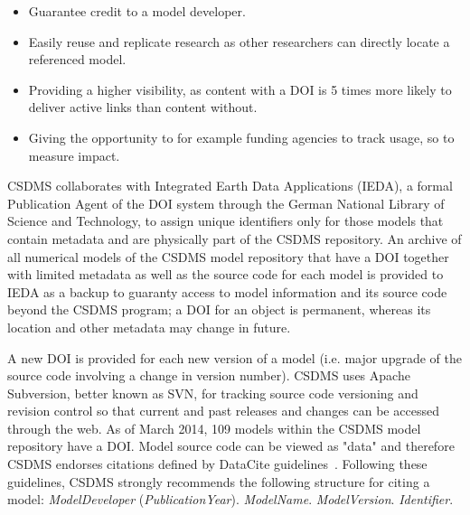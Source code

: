 \documentclass[11pt, oneside]{amsart}
\begin{document}
\begin{itemize}

\item Guarantee credit to a model developer.

\item Easily reuse and replicate research as other researchers can directly
      locate a referenced model.

\item Providing a higher visibility, as content with a DOI is 5 times more
      likely to deliver active links than content without.

\item Giving the opportunity to for example funding agencies to track usage,
      so to measure impact.

\end{itemize}

CSDMS collaborates with Integrated Earth Data Applications
(IEDA), a formal Publication Agent of the DOI system through the German National
Library of Science and Technology, to assign unique identifiers only for those
models that contain metadata and are physically part of the CSDMS repository. An
archive of all numerical models of the CSDMS model repository that have a DOI
together with limited metadata as well as the source code for each model is
provided to IEDA as a backup to guaranty access to model information and its
source code beyond the CSDMS program; a DOI for an object is permanent, whereas
its location and other metadata may change in future.

A new DOI is provided for each new version of a model (i.e. major upgrade of the
source code involving a change in version number). CSDMS uses Apache Subversion,
better known as SVN, for tracking source code versioning and revision control so
that current and past releases and changes can be accessed through the web. As
of March 2014, 109 models within the CSDMS model repository have a DOI. Model
source code can be viewed as "data" and therefore CSDMS endorses citations
defined by DataCite guidelines~\cite{brase2009datacite}. Following these guidelines, CSDMS
strongly recommends the following structure for citing a model:
\emph{ModelDeveloper} (\emph{PublicationYear}). \emph{ModelName}.
\emph{ModelVersion}. \emph{Identifier}.
\end{document}
